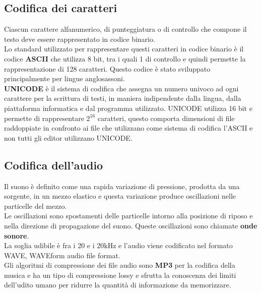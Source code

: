 \documentclass[12pt]{report}
\begin{document}
		\subsection{Codifica dei caratteri}
		Ciascun carattere alfanumerico, di punteggiatura o di controllo che compone il testo deve essere rappresentato in codice binario.
		\\
		Lo standard utilizzato per rappresentare questi caratteri in codice binario è il codice \textbf{ASCII} che utilizza 8 bit, tra i quali 1 di controllo e quindi permette la rappresentazione di 128 caratteri. Questo codice è stato sviluppato principalmente per lingue anglosassoni.
		\\
		\textbf{UNICODE} è il sistema di codifica che assegna un numero univoco ad ogni carattere per la scrittura di testi, in maniera indipendente dalla lingua, dalla piattaforma informatica e dal programma utilizzato. UNICODE utilizza 16 bit e permette di rappresentare $2^{16}$ caratteri, questo comporta dimensioni di file raddoppiate in confronto ai file che utilizzano come sistema di codifica l'ASCII e non tutti gli editor utilizzano UNICODE.
		\subsection{Codifica dell'audio}
		Il suono è definito come una rapida variazione di pressione, prodotta da una sorgente, in un mezzo elastico e questa variazione produce oscillazioni nelle particelle del mezzo.
		\\
		Le oscillazioni sono spostamenti delle particelle intorno alla posizione di riposo e nella direzione di propagazione del suono. Queste oscillazioni sono chiamate \textbf{onde sonore}.
		\\
		La soglia udibile è fra i 20 e i 20kHz e l'audio viene codificato nel formato WAVE, WAVEform audio file format.
		\\
		Gli algoritmi di compressione dei file audio sono \textbf{MP3} per la codifica della musica e ha un tipo di compressione lossy e sfrutta la conoscenza dei limiti dell'udito umano per ridurre la quantità di informazione da memorizzare.
\end{document}

